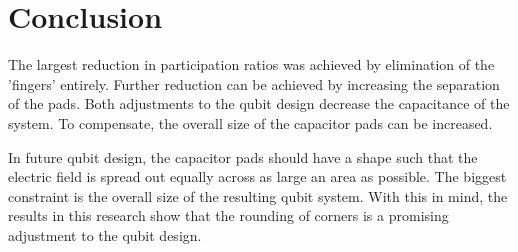 \chapter{Conclusion}
The largest reduction in participation ratios was achieved by elimination of the 'fingers' entirely. Further reduction can be achieved by increasing the separation of the pads. Both adjustments to the qubit design decrease the capacitance of the system. To compensate, the overall size of the capacitor pads can be increased.

In future qubit design, the capacitor pads should have a shape such that the electric field is spread out equally across as large an area as possible. The biggest constraint is the overall size of the resulting qubit system. With this in mind, the results in this research show that the rounding of corners is a promising adjustment to the qubit design. 